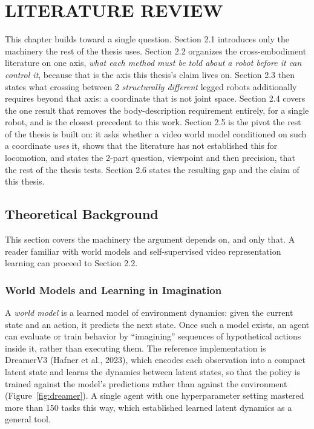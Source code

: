 \documentclass[12pt,a4paper,oneside]{report}
\begin{document}
\chapter{LITERATURE REVIEW}

This chapter builds toward a single question. Section 2.1 introduces only the machinery the rest of
the thesis uses. Section 2.2 organizes the cross-embodiment literature on one axis,
\emph{what each method must be told about a robot before it can control it}, because that is the
axis this thesis's claim lives on. Section 2.3 then states what crossing between 2
\emph{structurally different} legged robots additionally requires beyond that axis: a coordinate
that is not joint space. Section 2.4 covers the one result that removes the body-description
requirement entirely, for a single robot, and is the closest precedent to this work. Section 2.5 is
the pivot the rest of the thesis is built on: it asks whether a video world model conditioned on such
a coordinate \emph{uses} it, shows that the literature has not established this for
locomotion, and states the 2-part question, viewpoint and then precision, that the rest of the thesis tests.
Section 2.6 states the resulting gap and the claim of this thesis.

\section{Theoretical Background}
This section covers the machinery the argument depends on, and only that. A reader familiar with
world models and self-supervised video representation learning can proceed to Section 2.2.

\subsection{World Models and Learning in Imagination}
A \emph{world model} is a learned model of environment dynamics: given the current state and an
action, it predicts the next state. Once such a model exists, an agent can evaluate or train
behavior by ``imagining'' sequences of hypothetical actions inside it, rather than executing them.
The reference implementation is DreamerV3 (Hafner et al., 2023), which encodes each observation into
a compact latent state and learns the dynamics between latent states, so that the policy is trained
against the model's predictions rather than against the environment (Figure~\ref{fig:dreamer}). A
single agent with one hyperparameter setting mastered more than 150 tasks this way, which
established learned latent dynamics as a general tool.
\end{document}
